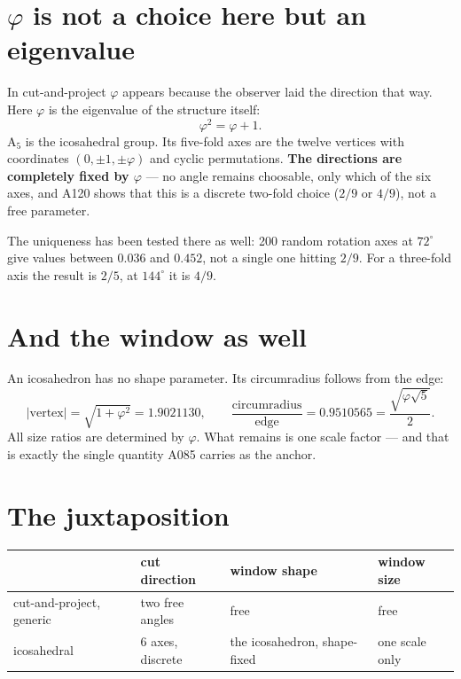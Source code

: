 \section{\texorpdfstring{$\varphi$}{phi} is not a choice here but an
eigenvalue}

In cut-and-project $\varphi$ appears because the observer laid the
direction that way. Here $\varphi$ is the eigenvalue of the structure
itself:
\[
  \varphi^2 = \varphi + 1 .
\]
A$_5$ is the icosahedral group. Its five-fold axes are the twelve
vertices with coordinates $(0, \pm1, \pm\varphi)$ and cyclic
permutations. \textbf{The directions are completely fixed by
$\varphi$} --- no angle remains choosable, only which of the six axes,
and A120 shows that this is a discrete two-fold choice ($2/9$ or
$4/9$), not a free parameter.

The uniqueness has been tested there as well: 200 random rotation axes
at $72^\circ$ give values between $0.036$ and $0.452$, not a single one
hitting $2/9$. For a three-fold axis the result is $2/5$, at $144^\circ$
it is $4/9$.

\section{And the window as well}

An icosahedron has no shape parameter. Its circumradius follows from
the edge:
\[
  |\text{vertex}| = \sqrt{1 + \varphi^2} = 1.9021130, \qquad
  \frac{\text{circumradius}}{\text{edge}} = 0.9510565
  = \frac{\sqrt{\varphi\sqrt5}}{2}.
\]
All size ratios are determined by $\varphi$. What remains is one scale
factor --- and that is exactly the single quantity A085 carries as the
anchor.

\section{The juxtaposition}

\begin{center}
\begin{tabular}{llll}
\toprule
 & cut direction & window shape & window size \\
\midrule
cut-and-project, generic & two free angles & free & free \\
icosahedral & 6 axes, discrete & the icosahedron, shape-fixed & one scale only \\
\bottomrule
\end{tabular}
\end{center}

